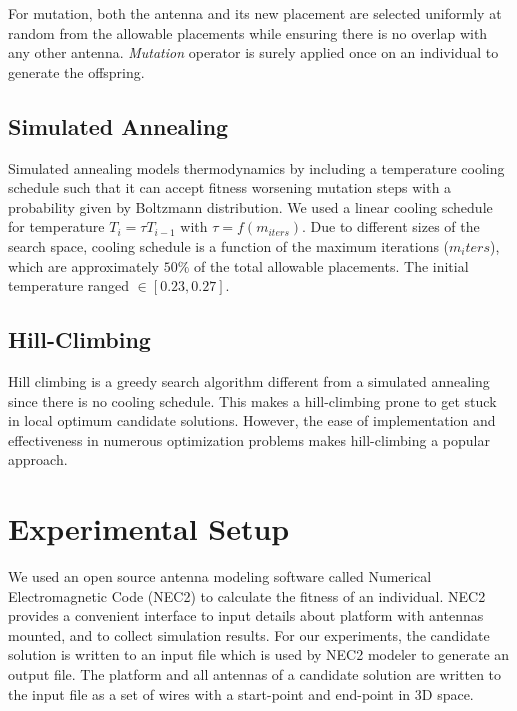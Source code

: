 \documentclass[conference]{IEEEtran}
\begin{document}
For mutation, both the antenna and its new placement are selected uniformly at random from the allowable placements while ensuring there is no overlap with any other antenna. \textit{Mutation} operator is surely applied once on an individual to generate the offspring.
\subsection{Simulated Annealing}
\label{sec:algoriths-sa}
Simulated annealing models thermodynamics by including a temperature cooling schedule such that it can accept fitness worsening mutation steps with a probability given by Boltzmann distribution. We used a linear cooling schedule for temperature $T_i = \tau T_{i-1}$ with $\tau = f(m_{iters})$. Due to different sizes of the search space, cooling schedule is a function of the maximum iterations ($m_iters$), which are approximately $50\%$ of the total allowable placements. The initial temperature ranged $\in [0.23, 0.27]$.
\subsection{Hill-Climbing}
\label{sec:algoriths-hc}
Hill climbing is a greedy search algorithm different from a simulated annealing since there is no cooling schedule. This makes a hill-climbing prone to get stuck in local optimum candidate solutions. However, the ease of implementation and effectiveness in numerous optimization problems \cite{skalak1994} makes hill-climbing a popular approach.

\section{Experimental Setup}
\label{sec:setup}
We used an open source antenna modeling software called Numerical Electromagnetic Code (NEC2) to calculate the fitness of an individual. NEC2 provides a convenient interface to input details about platform with antennas mounted, and to collect simulation results. For our experiments, the candidate solution is written to an input file which is used by NEC2 modeler to generate an output file. The platform and all antennas of a candidate solution are written to the input file as a set of wires with a start-point and end-point in 3D space.  
\end{document}
